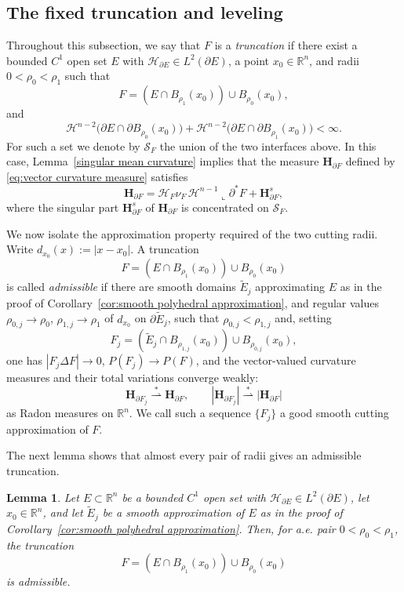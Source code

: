 \documentclass[reqno,11pt]{amsart}
\makeatletter
\newcommand{\R}{\mathbb R}
\newcommand{\HH}{\mathscr H}
\newtheorem{lem}[thm]{Lemma}%
\numberwithin{equation}{section}
\theoremstyle{remark}
\makeatother
\begin{document}
\subsection{The fixed truncation and leveling}\label{sec:truncate}

Throughout this subsection, we say that $F$ is a \emph{truncation} if there
exist a bounded $C^1$ open set $E$ with
$\mathcal H_{\partial E}\in L^2(\partial E)$, a point $x_0\in\R^n$, and radii
$0<\rho_0<\rho_1$ such that
\[
F=(E\cap B_{\rho_1}(x_0))\cup B_{\rho_0}(x_0),
\]
and
\[
\HH^{n-2}\bigl(\partial E\cap\partial B_{\rho_0}(x_0)\bigr)
+\HH^{n-2}\bigl(\partial E\cap\partial B_{\rho_1}(x_0)\bigr)<\infty .
\]
For such a set we denote by $\mathcal S_F$ the union of the two interfaces
above. In this case, Lemma~\ref{singular mean curvature} implies that the measure $\mathbf H_{\partial F}$ defined by
\eqref{eq:vector curvature measure} satisfies
\[
\mathbf H_{\partial F}
=\mathcal H_F\nu_F\,\HH^{n-1}\llcorner\partial^*F+\mathbf H^s_{\partial F},
\]
where the singular part $\mathbf H^s_{\partial F}$ of $\mathbf H_{\partial F}$ is concentrated on
$\mathcal S_F$.

We now isolate the approximation property required of the two cutting radii.
Write $d_{x_0}(x):=|x-x_0|$. A truncation
\[
F=(E\cap B_{\rho_1}(x_0))\cup B_{\rho_0}(x_0)
\]
is called \emph{admissible} if there are smooth domains $\widetilde E_j$
approximating $E$ as in the proof of
Corollary~\ref{cor:smooth polyhedral approximation}, and regular values
$\rho_{0,j}\to\rho_0$, $\rho_{1,j}\to\rho_1$ of $d_{x_0}$ on
$\partial\widetilde E_j$, such that $\rho_{0,j}<\rho_{1,j}$ and, setting
\[
F_j=(\widetilde E_j\cap B_{\rho_{1,j}}(x_0))\cup B_{\rho_{0,j}}(x_0),
\]
one has $|F_j\Delta F|\to 0$, $P(F_j)\to P(F)$, and
the vector-valued curvature measures and their total variations converge
weakly:
\[
\mathbf H_{\partial F_j}\stackrel{*}{\rightharpoonup}\mathbf H_{\partial F},
\qquad
|\mathbf H_{\partial F_j}|\stackrel{*}{\rightharpoonup}
|\mathbf H_{\partial F}|
\]
as Radon measures on $\R^n$.
We call such a sequence $\{F_j\}$ a good smooth cutting approximation of $F$.

The next lemma shows that almost every pair of radii gives an admissible
truncation.

\begin{lem}\label{lem:good-cutting-levels}
Let $E\subset\R^n$ be a bounded $C^1$ open set with
$\mathcal H_{\partial E}\in L^2(\partial E)$, let $x_0\in\R^n$, and let
$\widetilde E_j$ be a smooth approximation of $E$ as in the proof of
Corollary~\ref{cor:smooth polyhedral approximation}. Then, for a.e. pair
$0<\rho_0<\rho_1$, the truncation
\[
F=(E\cap B_{\rho_1}(x_0))\cup B_{\rho_0}(x_0)
\]
is admissible.
\end{lem}
\end{document}
